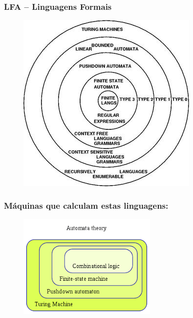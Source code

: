 \documentclass[10pt]{beamer}
\begin{document}

















\begin{frame}[fragile]
\frametitle{LFA -- Linguagens  Formais}
\begin{figure}[!ht]
	\centering
	\includegraphics[height =.5\textheight,width=.5\textwidth]
	{figuras/Chomsky_Venn.jpg}
\end{figure}

\end{frame}


\begin{frame}[fragile]
\frametitle{Máquinas que calculam estas linguagens: }
\begin{figure}[!ht]
	\centering
	\includegraphics[height =.5\textheight,width=.5\textwidth]
	{figuras/circuitos_a_MT.png}
\end{figure}

\end{frame}
\end{document}
